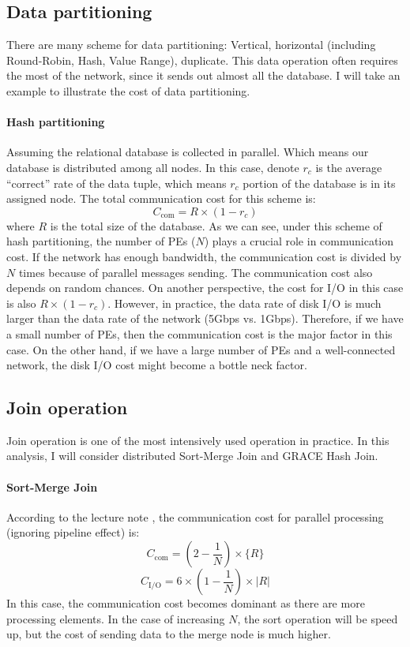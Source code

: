 \documentclass[a4paper,12pt]{article}
\begin{document}
\subsection{Data partitioning}
\noindent
There are many scheme for data partitioning: Vertical, horizontal (including Round-Robin, Hash, Value Range), duplicate. This data operation often requires the most of the network, since it sends out almost all the database. I will take an example to illustrate the cost of data partitioning.

\paragraph{Hash partitioning} Assuming the relational database is collected in parallel. Which means our database is distributed among all nodes. In this case, denote $r_c$ is the average ``correct'' rate of the data tuple, which means $r_c$ portion of the database is in its assigned node. The total communication cost for this scheme is:
$$
C_{\mbox{com}} = {R} \times (1 - r_c)
$$
where ${R}$ is the total size of the database. As we can see, under this scheme of hash partitioning, the number of PEs ($N$) plays a crucial role in communication cost. If the network has enough bandwidth, the communication cost is divided by $N$ times because of parallel messages sending. The communication cost also depends on random chances. On another perspective, the cost for I/O in this case is also ${R} \times (1 - r_c)$. However, in practice, the data rate of disk I/O is much larger than the data rate of the network (5Gbps vs. 1Gbps). Therefore, if we have a small number of PEs, then the communication cost is the major factor in this case. On the other hand, if we have a large number of PEs and a well-connected network, the disk I/O cost might become a bottle neck factor.

\subsection{Join operation}
\noindent
Join operation is one of the most intensively used operation in practice. In this analysis, I will consider distributed Sort-Merge Join and GRACE Hash Join. 

\paragraph{Sort-Merge Join} According to the lecture note \cite{lec1011}, the communication cost for parallel processing (ignoring pipeline effect) is:
$$
C_{\mbox{com}} = (2 - \frac{1}{N}) \times \{R\}
$$
$$
C_{\mbox{I/O}} = 6 \times (1 - \frac{1}{N}) \times |R|
$$
In this case, the communication cost becomes dominant as there are more processing elements. In the case of increasing $N$, the sort operation will be speed up, but the cost of sending data to the merge node is much higher.
\end{document}

